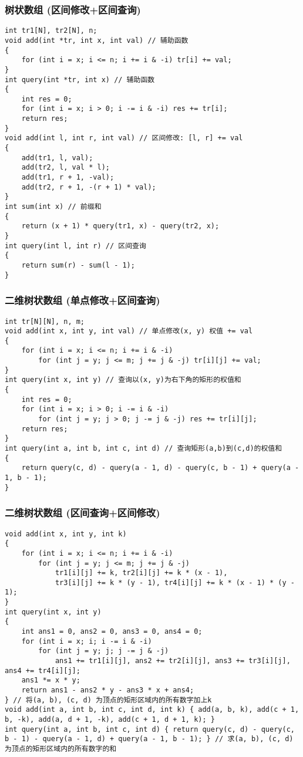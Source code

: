 \documentclass[a4paper, fontset=none]{ctexart}
\begin{document}
\subsubsection{树状数组 (区间修改+区间查询)}
\begin{verbatim}
int tr1[N], tr2[N], n;
void add(int *tr, int x, int val) // 辅助函数
{
    for (int i = x; i <= n; i += i & -i) tr[i] += val;
}
int query(int *tr, int x) // 辅助函数
{
    int res = 0;
    for (int i = x; i > 0; i -= i & -i) res += tr[i];
    return res;
}
void add(int l, int r, int val) // 区间修改: [l, r] += val
{
    add(tr1, l, val);
    add(tr2, l, val * l);
    add(tr1, r + 1, -val);
    add(tr2, r + 1, -(r + 1) * val);
}
int sum(int x) // 前缀和
{
    return (x + 1) * query(tr1, x) - query(tr2, x);
}
int query(int l, int r) // 区间查询
{
    return sum(r) - sum(l - 1);
}
\end{verbatim}
\subsubsection{二维树状数组 (单点修改+区间查询)}
\begin{verbatim}
int tr[N][N], n, m;
void add(int x, int y, int val) // 单点修改(x, y) 权值 += val
{
    for (int i = x; i <= n; i += i & -i)
        for (int j = y; j <= m; j += j & -j) tr[i][j] += val;
}
int query(int x, int y) // 查询以(x, y)为右下角的矩形的权值和
{
    int res = 0;
    for (int i = x; i > 0; i -= i & -i)
        for (int j = y; j > 0; j -= j & -j) res += tr[i][j];
    return res;
}
int query(int a, int b, int c, int d) // 查询矩形(a,b)到(c,d)的权值和
{
    return query(c, d) - query(a - 1, d) - query(c, b - 1) + query(a - 1, b - 1);
}
\end{verbatim}
\subsubsection{二维树状数组 (区间查询+区间修改)}

\begin{verbatim}
void add(int x, int y, int k)
{
    for (int i = x; i <= n; i += i & -i)
        for (int j = y; j <= m; j += j & -j)
            tr1[i][j] += k, tr2[i][j] += k * (x - 1),
            tr3[i][j] += k * (y - 1), tr4[i][j] += k * (x - 1) * (y - 1);
}
int query(int x, int y)
{
    int ans1 = 0, ans2 = 0, ans3 = 0, ans4 = 0;
    for (int i = x; i; i -= i & -i)
        for (int j = y; j; j -= j & -j)
            ans1 += tr1[i][j], ans2 += tr2[i][j], ans3 += tr3[i][j], ans4 += tr4[i][j];
    ans1 *= x * y;
    return ans1 - ans2 * y - ans3 * x + ans4;
} // 将(a, b), (c, d) 为顶点的矩形区域内的所有数字加上k
void add(int a, int b, int c, int d, int k) { add(a, b, k), add(c + 1, b, -k), add(a, d + 1, -k), add(c + 1, d + 1, k); }
int query(int a, int b, int c, int d) { return query(c, d) - query(c, b - 1) - query(a - 1, d) + query(a - 1, b - 1); } // 求(a, b), (c, d) 为顶点的矩形区域内的所有数字的和

\end{verbatim}
\end{document}
